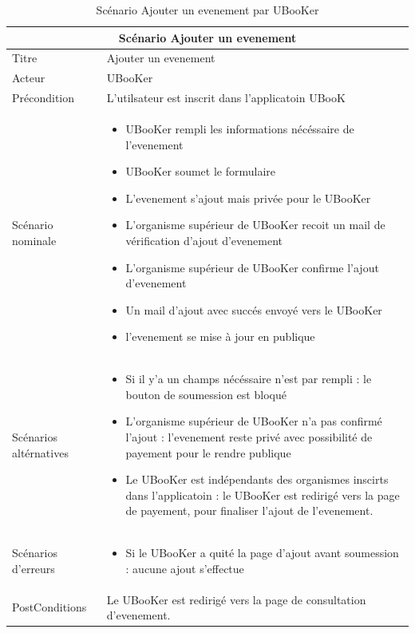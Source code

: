 \documentclass[12pt]{report}
\begin{document}
\begin{table}[h!]
\begin{center}
\begin{tabular}{ |p{4cm}|p{11cm}|  }
 \hline
 \multicolumn{2}{|c|}{Scénario Ajouter un evenement} \\
 \hline
 Titre & Ajouter un evenement\\
 \hline
 Acteur& UBooKer \\
 \hline
 Précondition   &  L'utilsateur est inscrit dans l'applicatoin UBooK   \\
 \hline 
 Scénario nominale &   \begin{itemize}
 \item UBooKer rempli les informations nécéssaire de l'evenement
 \item UBooKer soumet le formulaire
  \item L'evenement s'ajout mais privée pour le UBooKer
 \item L'organisme supérieur de UBooKer recoit un mail de vérification d'ajout d'evenement
 \item L'organisme supérieur de UBooKer confirme l'ajout d'evenement
 \item Un mail d'ajout avec succés envoyé vers le UBooKer
 \item l'evenement se mise à jour en publique
\end{itemize}   \\
 \hline
 Scénarios altérnatives & \begin{itemize}
 \item Si il y'a un champs nécéssaire n'est par rempli : le bouton de soumession est bloqué
 \item L'organisme supérieur de UBooKer n'a pas confirmé l'ajout : l'evenement reste privé avec possibilité de payement pour le rendre publique
  \item Le UBooKer est indépendants des organismes inscirts dans l'applicatoin : le UBooKer est redirigé vers la page de payement, pour finaliser l'ajout de l'evenement.
\end{itemize}   \\
 \hline
 Scénarios d'erreurs &  \begin{itemize}
 \item Si le UBooKer a quité la page d'ajout avant soumession : 
 aucune ajout s'effectue
\end{itemize}   \\
 \hline
 PostConditions & Le UBooKer est redirigé vers la page de consultation d'evenement. \\
 \hline
\end{tabular}
\caption{Scénario Ajouter un evenement par UBooKer}
\label{tableau:scénario ajouter un evenemnt par ubooker}
\end{center}
\end{table}
\end{document}
